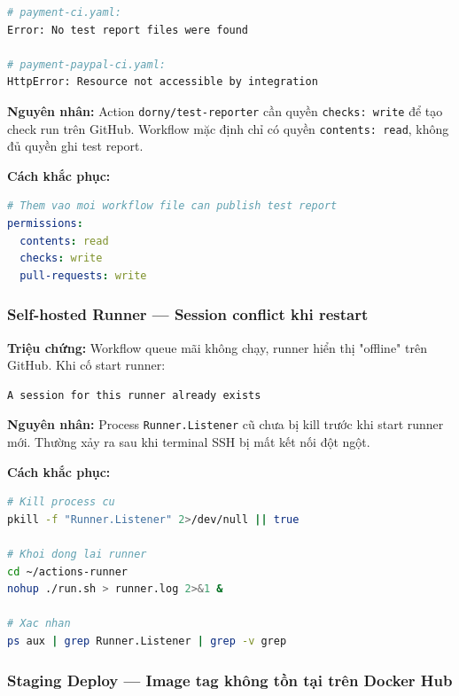 \begin{lstlisting}[language=bash]
# payment-ci.yaml:
Error: No test report files were found

# payment-paypal-ci.yaml:
HttpError: Resource not accessible by integration
\end{lstlisting}

\textbf{Nguyên nhân:} Action \texttt{dorny/test-reporter} cần quyền \texttt{checks: write} để tạo check run trên GitHub. Workflow mặc định chỉ có quyền \texttt{contents: read}, không đủ quyền ghi test report.

\textbf{Cách khắc phục:}

\begin{lstlisting}[language=yaml]
# Them vao moi workflow file can publish test report
permissions:
  contents: read
  checks: write
  pull-requests: write
\end{lstlisting}

\subsubsection{Self-hosted Runner — Session conflict khi restart}

\textbf{Triệu chứng:} Workflow queue mãi không chạy, runner hiển thị "offline" trên GitHub. Khi cố start runner:

\begin{lstlisting}[language=bash]
A session for this runner already exists
\end{lstlisting}

\textbf{Nguyên nhân:} Process \texttt{Runner.Listener} cũ chưa bị kill trước khi start runner mới. Thường xảy ra sau khi terminal SSH bị mất kết nối đột ngột.

\textbf{Cách khắc phục:}

\begin{lstlisting}[language=bash]
# Kill process cu
pkill -f "Runner.Listener" 2>/dev/null || true

# Khoi dong lai runner
cd ~/actions-runner
nohup ./run.sh > runner.log 2>&1 &

# Xac nhan
ps aux | grep Runner.Listener | grep -v grep
\end{lstlisting}

\subsubsection{Staging Deploy — Image tag không tồn tại trên Docker Hub}

